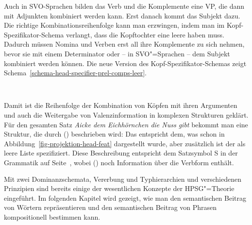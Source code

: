 Auch in SVO-Sprachen bilden das Verb und die Komplemente eine VP, die dann mit Adjunkten kombiniert
werden kann. Erst danach kommt das Subjekt dazu. Die richtige Kombinationsreihenfolge kann man
erzwingen, indem man im Kopf-Spezifikator-Schema verlangt, dass die Kopftochter eine leere \compsl
haben muss. Dadurch müssen Nomina und Verben erst all ihre Komplemente zu sich nehmen, bevor sie mit
einem Determinator oder -- in SVO"=Sprachen -- dem Subjekt kombiniert werden können. Die neue
Version des Kopf-Spezifikator-Schemas zeigt Schema~\ref{schema-head-specifier-prel-comps-leer}.
\begin{schema}
\label{schema-head-specifier-prel-comps-leer}
 \impl\\
\end{schema}


\noindent
Damit ist die Reihenfolge der Kombination von Köpfen mit ihren Argumenten und auch die Weitergabe
von Valenzinformation in komplexen Strukturen geklärt. Für den gesamten Satz \emph{Aicke dem Eichhörnchen die Nuss gibt} bekommt man eine Struktur, die durch ()
beschrieben wird:
\ea
{}
\z
Das entspricht dem, was schon in Abbildung~\ref{fig-projektion-head-feat} dargestellt wurde, aber
zusätzlich ist der \sprw als leere Liste spezifiziert. Diese Beschreibung entspricht dem Satzsymbol S in der Grammatik auf
Seite~\pageref{bsp-grammatik-psg}, wobei () noch Information über die Verbform enthält.



Mit zwei Dominanzschemata, Vererbung und Typhierarchien und verschiedenen Prinzipien sind bereits einige der wesentlichen Konzepte der HPSG"=Theorie eingeführt. Im folgenden
Kapitel wird gezeigt, wie man den semantischen Beitrag von Wörtern repräsentieren und den
semantischen Beitrag von Phrasen kompositionell bestimmen kann.






